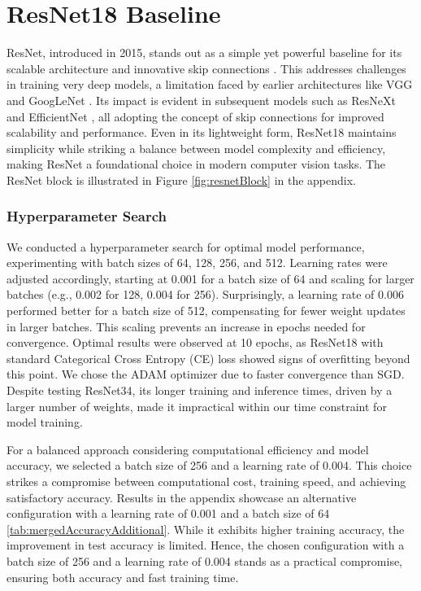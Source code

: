 \documentclass[11pt,twocolumn,letterpaper]{article}
\begin{document}
\section{ResNet18 Baseline}
ResNet, introduced in 2015, stands out as a simple yet powerful baseline for its scalable architecture and innovative skip connections \cite{heDeepResidualLearning2015}. This addresses challenges in training very deep models, a limitation faced by earlier architectures like VGG \cite{simonyanVeryDeepConvolutional2015} and GoogLeNet \cite{szegedyInceptionv4InceptionResNetImpact2017}. Its impact is evident in subsequent models such as ResNeXt \cite{xieAggregatedResidualTransformations2017} and EfficientNet \cite{tanEfficientNetRethinkingModel2020}, all adopting the concept of skip connections for improved scalability and performance. Even in its lightweight form, ResNet18 maintains simplicity while striking a balance between model complexity and efficiency, making ResNet a foundational choice in modern computer vision tasks. The ResNet block is illustrated in Figure \ref{fig:resnetBlock} in the appendix. 

\subsubsection*{Hyperparameter Search}

We conducted a hyperparameter search for optimal model performance, experimenting with batch sizes of 64, 128, 256, and 512. Learning rates were adjusted accordingly, starting at 0.001 for a batch size of 64 and scaling for larger batches (e.g., 0.002 for 128, 0.004 for 256). Surprisingly, a learning rate of 0.006 performed better for a batch size of 512, compensating for fewer weight updates in larger batches. This scaling prevents an increase in epochs needed for convergence. Optimal results were observed at 10 epochs, as ResNet18 with standard Categorical Cross Entropy (CE) loss showed signs of overfitting beyond this point. We chose the ADAM optimizer due to faster convergence than SGD. Despite testing ResNet34, its longer training and inference times, driven by a larger number of weights, made it impractical within our time constraint for model training.

For a balanced approach considering computational efficiency and model accuracy, we selected a batch size of 256 and a learning rate of 0.004. This choice strikes a compromise between computational cost, training speed, and achieving satisfactory accuracy. Results in the appendix showcase an alternative configuration with a learning rate of 0.001 and a batch size of 64 \ref{tab:mergedAccuracyAdditional}. While it exhibits higher training accuracy, the improvement in test accuracy is limited. Hence, the chosen configuration with a batch size of 256 and a learning rate of 0.004 stands as a practical compromise, ensuring both accuracy and fast training time.
\end{document}
